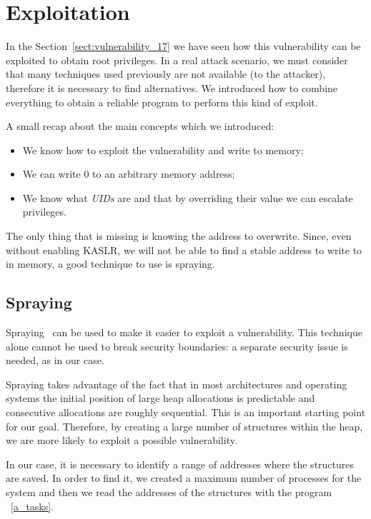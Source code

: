 \documentclass{masterthesis}
\newcommand{\refToSection}[1]{Section~\ref{sect:#1}\xspace}
\begin{document}
\section{Exploitation}
\label{sect:exp-cve}   
 
In the \refToSection{vulnerability_17} we have seen how this vulnerability can be exploited to obtain root privileges. In a real attack scenario, we must consider that many techniques used previously are not available (to the attacker), therefore it is necessary to find alternatives.
We introduced how to combine everything to obtain a reliable program to perform this kind of exploit.

A small recap about the main concepts which we introduced:
\begin{itemize}
   \item We know how to exploit the vulnerability and write to memory;
   \item We can write 0 to an arbitrary memory address;
   \item We know what \emph{UIDs} are and that by overriding their value we can escalate privileges.
\end {itemize}

The only thing that is missing is knowing the address to overwrite.
Since, even without enabling KASLR, we will not be able to find a stable address to write to in memory, a good technique to use is spraying.

\subsection{Spraying}
\label{subsect:spraying}

Spraying~\cite{ratanaworabhan2009nozzle} can be used to make it easier to exploit a vulnerability. This technique alone cannot be used to break security boundaries: a separate security issue is needed, as in our case.

Spraying takes advantage of the fact that in most architectures and operating systems the initial position of large heap allocations is predictable and consecutive allocations are roughly sequential. This is an important starting point for our goal.
Therefore, by creating a large number of structures within the heap, we are more likely to exploit a possible vulnerability.

In our case, it is necessary to identify a range of addresses where the structures are saved.
In order to find it, we created a maximum number of processes for the system and then we read the addresses of the structures with the program ~\ref{a_tasks}.
\end{document}
